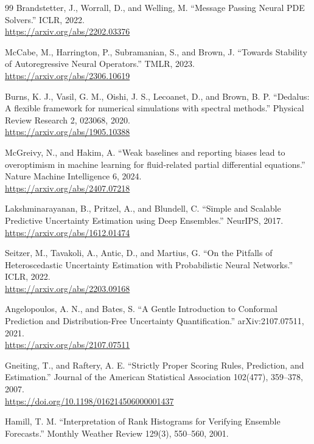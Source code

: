 \documentclass[11pt]{article}
\begin{document}
\begin{thebibliography}{99}
Brandstetter, J., Worrall, D., and Welling, M.
``Message Passing Neural PDE Solvers.''
ICLR, 2022.\\
\url{https://arxiv.org/abs/2202.03376}

McCabe, M., Harrington, P., Subramanian, S., and Brown, J.
``Towards Stability of Autoregressive Neural Operators.''
TMLR, 2023.\\
\url{https://arxiv.org/abs/2306.10619}

Burns, K. J., Vasil, G. M., Oishi, J. S., Lecoanet, D., and Brown, B. P.
``Dedalus: A flexible framework for numerical simulations with spectral methods.''
Physical Review Research 2, 023068, 2020.\\
\url{https://arxiv.org/abs/1905.10388}

McGreivy, N., and Hakim, A.
``Weak baselines and reporting biases lead to overoptimism in machine learning for fluid-related partial
differential equations.''
Nature Machine Intelligence 6, 2024.\\
\url{https://arxiv.org/abs/2407.07218}

Lakshminarayanan, B., Pritzel, A., and Blundell, C.
``Simple and Scalable Predictive Uncertainty Estimation using Deep Ensembles.''
NeurIPS, 2017.\\
\url{https://arxiv.org/abs/1612.01474}

Seitzer, M., Tavakoli, A., Antic, D., and Martius, G.
``On the Pitfalls of Heteroscedastic Uncertainty Estimation with Probabilistic Neural Networks.''
ICLR, 2022.\\
\url{https://arxiv.org/abs/2203.09168}

Angelopoulos, A. N., and Bates, S.
``A Gentle Introduction to Conformal Prediction and Distribution-Free Uncertainty Quantification.''
arXiv:2107.07511, 2021.\\
\url{https://arxiv.org/abs/2107.07511}

Gneiting, T., and Raftery, A. E.
``Strictly Proper Scoring Rules, Prediction, and Estimation.''
Journal of the American Statistical Association 102(477), 359--378, 2007.\\
\url{https://doi.org/10.1198/016214506000001437}

Hamill, T. M.
``Interpretation of Rank Histograms for Verifying Ensemble Forecasts.''
Monthly Weather Review 129(3), 550--560, 2001.


\end{thebibliography}
\end{document}
